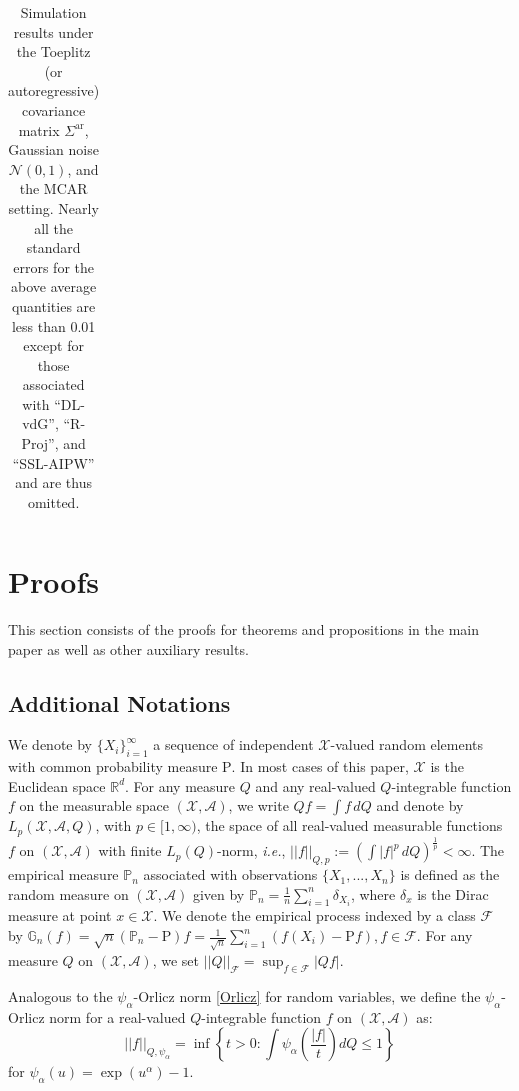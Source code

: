 \documentclass[ejsv2,noshowframe]{imsart}
\theoremstyle{plain}
\theoremstyle{definition}
\theoremstyle{remark}
\newcommand{\norm}[1]{\left|\left| #1 \right|\right|}
\begin{document}
\begin{table}[hbtp!]
\begin{center}
{\begin{tabular}{ccccccccccccccccccc}
			\hline\hline
	\end{tabular}}
	\caption{Simulation results under the Toeplitz (or autoregressive) covariance matrix $\Sigma^{\mathrm{ar}}$, Gaussian noise $\mathcal{N}(0,1)$, and the MCAR setting. Nearly all the standard errors for the above average quantities are less than 0.01 except for those associated with ``DL-vdG'', ``R-Proj'', and ``SSL-AIPW'' and are thus omitted.}
	\label{table:AR_MCAR_res}
\end{center}
\end{table}

\section{Proofs}
\label{app:Proofs}

This section consists of the proofs for theorems and propositions in the main paper as well as other auxiliary results.

\subsection{Additional Notations}
\label{subapp:add_notation}

We denote by $\{X_i\}_{i=1}^{\infty}$ a sequence of independent $\mathcal{X}$-valued random elements with common probability measure $\mathrm{P}$. In most cases of this paper, $\mathcal{X}$ is the Euclidean space $\mathbb{R}^d$. For any measure $Q$ and any real-valued $Q$-integrable function $f$ on the measurable space $(\mathcal{X},\mathcal{A})$, we write $Qf=\int f\,dQ$ and denote by $L_p(\mathcal{X},\mathcal{A},Q)$, with $p\in[1,\infty)$, the space of all real-valued measurable functions $f$ on $(\mathcal{X},\mathcal{A})$ with finite $L_p(Q)$-norm, \emph{i.e.}, $\norm{f}_{Q,p} := \left(\int |f|^p\,dQ\right)^{\frac{1}{p}} < \infty$. The empirical measure $\mathbb{P}_n$ associated with observations $\{X_1,...,X_n\}$ is defined as the random measure on $(\mathcal{X},\mathcal{A})$ given by $\mathbb{P}_n=\frac{1}{n} \sum_{i=1}^n \delta_{X_i}$, where $\delta_x$ is the Dirac measure at point $x\in \mathcal{X}$. We denote the empirical process indexed by a class $\mathcal{F}$ by $\mathbb{G}_n(f)=\sqrt{n}\left(\mathbb{P}_n-\mathrm{P}\right) f = \frac{1}{\sqrt{n}} \sum_{i=1}^n \left(f(X_i)-\mathrm{P} f\right), f\in \mathcal{F}$. For any measure $Q$ on $(\mathcal{X},\mathcal{A})$, we set $\norm{Q}_{\mathcal{F}} = \sup_{f\in \mathcal{F}} |Qf|$. 

Analogous to the $\psi_{\alpha}$-Orlicz norm \eqref{Orlicz} for random variables, we define the $\psi_{\alpha}$-Orlicz norm for a real-valued $Q$-integrable function $f$ on $(\mathcal{X},\mathcal{A})$ as:
\begin{equation}
	\label{Orlicz_func}
	\norm{f}_{Q,\psi_{\alpha}} = \inf\left\{t>0: \int \psi_{\alpha}\left(\frac{|f|}{t} \right) dQ\leq 1\right\}
\end{equation}
for $\psi_{\alpha}(u)=\exp(u^{\alpha})-1$.
\end{document}
